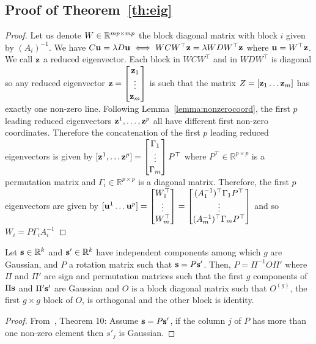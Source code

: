 \documentclass{report}
\begin{document}
{\subsection{Proof of Theorem~\ref{th:eig}}
\label{proof:eig}
\begin{proof}
  Let us denote $W \in \mathbb{R}^{mp \times mp}$ the block diagonal matrix with block $i$ given by
  $(A_i)^{-1}$. We have $C \mathbf{u} = \lambda D \mathbf{u}  \iff W C W^\top \mathbf{z} = \lambda W D W^\top \mathbf{z}
  $ where $\mathbf{u} = W^\top \mathbf{z}$. We call $\mathbf{z}$ a reduced eigenvector.
  Each
  block in $W C W^\top$ and in $W D W^\top$ is diagonal so any reduced eigenvector $\mathbf{z} = \begin{bmatrix} \mathbf{z}_1 \\ \vdots \\ \mathbf{z}_m \end{bmatrix}$ is
  such that the matrix $Z = [\mathbf{z}_1 \dots \mathbf{z}_m]$ has exactly one non-zero line.
  Following Lemma~\ref{lemma:nonzerocoord}, the first $p$ leading reduced
  eigenvectors $\mathbf{z}^1, \dots, \mathbf{z}^p$ all have different first non-zero coordinates.
  Therefore the concatenation of the first $p$ leading reduced eigenvectors is given
  by $[\mathbf{z}^1, \dots \mathbf{z}^p] = \begin{bmatrix} \Gamma_1 \\ \vdots \\ \Gamma_m \end{bmatrix} P^{\top}$ where $P^{\top} \in \mathbb{R}^{p \times p}$ is a permutation matrix and $\Gamma_i
  \in \mathbb{R}^{p \times p}$ is a diagonal matrix. Therefore, the first $p$
  eigenvectors are given by $[\mathbf{u}^1 \dots \mathbf{u}^p] = \begin{bmatrix} W_1^{\top} \\ \vdots \\ W_m^{\top} \end{bmatrix} = \begin{bmatrix} (A_1^{-1})^{\top} \Gamma_1 P^{\top} \\ \vdots \\ (A_m^{-1})^{\top} \Gamma_m P^{\top} \end{bmatrix}$  and so $W_i = P \Gamma_i A_i^{-1}$
\end{proof}


\begin{lemma}
\label{lemma:ica}
Let $\mathbf{s} \in \mathbb{R}^k$ and $\mathbf{s}'\in \mathbb{R}^k$ have independent components among which $g$ are Gaussian, and $P$ a rotation matrix such that $\mathbf{s} = P\mathbf{s}'$. Then, $P=\Pi^{-1} O \Pi'$ where $\Pi$ and $\Pi'$ are sign and permutation matrices such that the first $g$ components of $\Pi \mathbf{s}$ and $\Pi' \mathbf{s}'$ are Gaussian and $O$ is a block diagonal matrix such that $O^{(g)}$, the first $g \times g$ block of $O$, is orthogonal and the other block is identity.
\end{lemma}
\begin{proof}
  From~\cite{comon1994independent}, Theorem 10:
  Assume $\mathbf{s} = P\mathbf{s}'$, if the column $j$ of $P$ has more than one non-zero element then $s'_j$ is Gaussian. 
  

\end{proof}}
\end{document}
